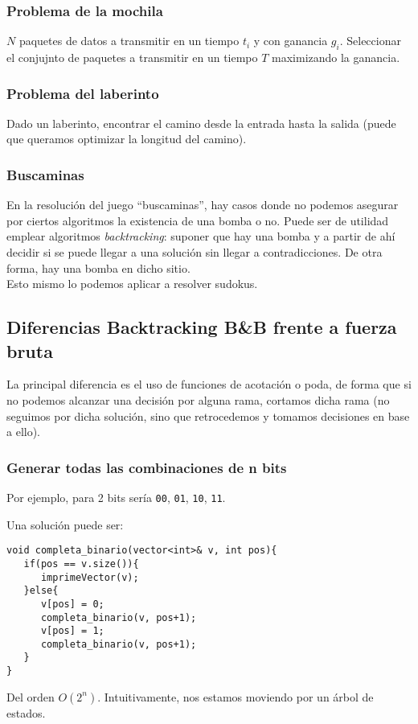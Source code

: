 \subsubsection{Problema de la mochila}
$N$ paquetes de datos a transmitir en un tiempo $t_i$ y con ganancia $g_i$. Seleccionar el conjujnto de paquetes a transmitir en un tiempo $T$ maximizando la ganancia.

\subsubsection{Problema del laberinto}
Dado un laberinto, encontrar el camino desde la entrada hasta la salida (puede que queramos optimizar la longitud del camino).

\subsubsection{Buscaminas}
En la resolución del juego ``buscaminas'', hay casos donde no podemos asegurar por ciertos algoritmos la existencia de una bomba o no. Puede ser de utilidad emplear algoritmos \emph{backtracking}: suponer que hay una bomba y a partir de ahí decidir si se puede llegar a una solución sin llegar a contradicciones. De otra forma, hay una bomba en dicho sitio.\\

Esto mismo lo podemos aplicar a resolver sudokus.

\subsection{Diferencias Backtracking B\&B frente a fuerza bruta}
La principal diferencia es el uso de funciones de acotación o poda, de forma que si no podemos alcanzar una decisión por alguna rama, cortamos dicha rama (no seguimos por dicha solución, sino que retrocedemos y tomamos decisiones en base a ello).

\subsubsection{Generar todas las combinaciones de n bits}
Por ejemplo, para 2 bits sería \verb|00|, \verb|01|, \verb|10|, \verb|11|.

Una solución puede ser:
\begin{verbatim}
void completa_binario(vector<int>& v, int pos){
   if(pos == v.size()){
      imprimeVector(v);
   }else{
      v[pos] = 0;
      completa_binario(v, pos+1);
      v[pos] = 1;
      completa_binario(v, pos+1);
   }
}
\end{verbatim}
Del orden $O(2^n)$. Intuitivamente, nos estamos moviendo por un árbol de estados.

